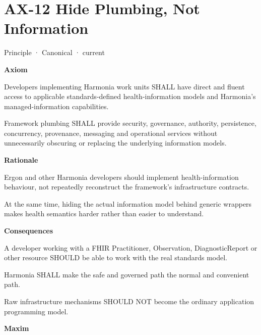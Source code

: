 \section{AX-12 Hide Plumbing, Not Information}

\label{element:ce85889bd9b34f79a53d4c907ceb19d4}
{\small Principle · Canonical · current}\par

\par\medskip\textbf{Axiom}\par


Developers implementing Harmonia work units SHALL have direct and fluent
access to applicable standards-defined health-information models and
Harmonia's managed-information capabilities.



Framework plumbing SHALL provide security, governance, authority,
persistence, concurrency, provenance, messaging and operational services
without unnecessarily obscuring or replacing the underlying information
models.



\par\medskip\textbf{Rationale}\par


Ergon and other Harmonia developers should
implement health-information behaviour, not repeatedly reconstruct the
framework's infrastructure contracts.



At the same time, hiding the actual information model behind generic
wrappers makes health semantics harder rather than easier to understand.



\par\medskip\textbf{Consequences}\par


A developer working with a FHIR Practitioner, Observation,
DiagnosticReport or other resource SHOULD be able to work with the real
standards model.



Harmonia SHALL make the safe and governed path the normal and convenient
path.



Raw infrastructure mechanisms SHOULD NOT become the ordinary application
programming model.



\par\medskip\textbf{Maxim}\par


